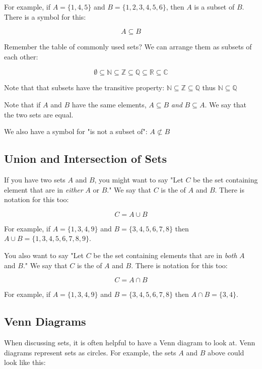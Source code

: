 For example, if $A = \{1,4,5\}$ and $B = \{1,2,3,4,5,6\}$, then $A$ is
a subset of $B$.  There is a symbol for this:

$$ A \subseteq B$$

Remember the table of commonly used sets?  We can arrange them as
subsets of each other:

$$\emptyset \subseteq \mathbb{N} \subseteq \mathbb{Z} \subseteq \mathbb{Q} \subseteq \mathbb{R} \subseteq \mathbb{C}$$

Note that that subsets have the transitive property: $\mathbb{N}
\subseteq \mathbb{Z} \subseteq \mathbb{Q}$ thus $\mathbb{N} \subseteq
\mathbb{Q}$

Note that if $A$ and $B$ have the same elements, $A \subseteq B$
\textit{ and } $B \subseteq A$.  We say that the two sets are equal.

We also have a symbol for "is not a subset of": $A \not\subset B$

\subsection{Union and Intersection of Sets}

If you have two sets $A$ and $B$, you might want to say "Let $C$ be
the set containing element that are in \textit{either} $A$ or $B$."
We say that $C$ is the  of $A$ and $B$.  There is
notation for this too:

$$C = A \cup B$$

For example,  if $A = \{1,3,4,9\}$ and $B = \{3,4,5,6,7,8\}$  then $A \cup B =  \{1,3,4,5,6,7,8,9\}$.

You also want to say "Let $C$ be the set containing elements that are
in \textit{both} $A$ and $B$."  We say that $C$ is the
 of $A$ and $B$.  There is notation for this
too:

$$C = A \cap B$$

For example,  if $A = \{1,3,4,9\}$ and $B = \{3,4,5,6,7,8\}$  then $A \cap B =  \{3,4\}$.

\subsection{Venn Diagrams}

When discussing sets, it is often helpful to have a Venn diagram to
look at.  Venn diagrams represent sets as circles. For example, the
sets $A$ and $B$ above could look like this:

